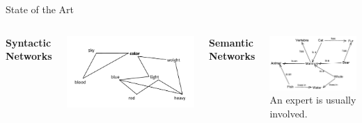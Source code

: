 \documentclass[10pt,xcolor=table]{beamer}
\begin{document}
\begin{frame}{State of the Art}
\begin{columns}
		\textbf{\normalsize Syntactic Networks} 
		\begin{minipage}[c][0.3\textheight][c]{\linewidth}
		\includegraphics[width=1\linewidth]{image2/Chapitre2/syn_net1.pdf}
		\end{minipage}
	
		\textbf{\normalsize Semantic Networks} 
		\begin{minipage}[c][0.3\textheight][c]{\linewidth}
		\includegraphics[width=1\linewidth]{image2/Chapitre2/sem_net.pdf}
		An expert is usually involved.
		\end{minipage}
	\end{columns}

\end{frame}
\end{document}

